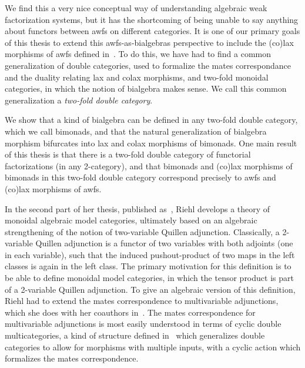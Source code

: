 We find this a very nice conceptual way of understanding algebraic weak factorization systems, but it has the shortcoming of being unable to say anything about functors between awfs on different categories. It is one of our primary goals of this thesis to extend this awfs-as-bialgebras perspective to include the (co)lax morphisms of awfs defined in~\cite{riehl:nwfs-model}. To do this, we have had to find a common generalization of double categories, used to formalize the mates correspondance and the duality relating lax and colax morphisms, and two-fold monoidal categories, in which the notion of bialgebra makes sense. We call this common generalization a \emph{two-fold double category}.

We show that a kind of bialgebra can be defined in any two-fold double category, which we call bimonads, and that the natural generalization of bialgebra morphism bifurcates into lax and colax morphisms of bimonads. One main result of this thesis is that there is a two-fold double category of functorial factorizations (in any 2-category), and that bimonads and (co)lax morphisms of bimonads in this two-fold double category correspond precisely to awfs and (co)lax morphisms of awfs.

In the second part of her thesis, published as~\cite{riehl:nwfs-monoidal}, Riehl develops a theory of monoidal algebraic model categories, ultimately based on an algebraic strengthening of the notion of two-variable Quillen adjunction. Classically, a 2-variable Quillen adjunction is a functor of two variables with both adjoints (one in each variable), such that the induced pushout-product of two maps in the left classes is again in the left class. The primary motivation for this definition is to be able to define monoidal model categories, in which the tensor product is part of a 2-variable Quillen adjunction. To give an algebraic version of this definition, Riehl had to extend the mates correspondence to multivariable adjunctions, which she does with her coauthors in~\cite{cgr:mates}. The mates correspondence for multivariable adjunctions is most easily understood in terms of cyclic double multicategories, a kind of structure defined in~\cite{cgr:mates} which generalizes double categories to allow for morphisms with multiple inputs, with a cyclic action which formalizes the mates correspondence.

